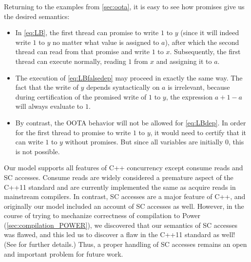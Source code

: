 Returning to the examples from \cref{sec:oota}, it is easy to see how
promises give us the desired semantics:
\begin{itemize}
\item In \ref{eq:LB}, the first thread can promise to write $1$ to $y$ (since
  it will indeed write $1$ to $y$ no matter what value is assigned to
  $a$), after which the second thread can read from that promise and
  write $1$ to $x$.  Subsequently, the first thread can execute
  normally, reading $1$ from $x$ and assigning it to $a$.
\item The execution of \ref{eq:LBfalsedep} may proceed in exactly the same way.  The
  fact that the write of $y$ depends syntactically on $a$ is
  irrelevant, because during certification of the promised write of $1$
  to $y$, the expression $a+1-a$ will always evaluate to $1$.
\item By contrast, the OOTA behavior will not be allowed for \ref{eq:LBdep}.
  In order for the first thread to promise to write $1$ to $y$, it
  would need to certify that it can write $1$ to $y$ 
without promises.  But since all variables are
  initially $0$, this is not possible.
\end{itemize}

Our model supports all features of C++ concurrency except consume
reads and SC accesses.  Consume reads are widely considered a
premature aspect of the C++11 standard and are currently implemented
the same as acquire reads in mainstream compilers.  In contrast, SC
accesses are a major feature of C++, and originally our model included
an account of SC accesses as well.  However, in the course of trying
to mechanize correctness of compilation to Power
(\cref{sec:compilation_POWER}), we discovered that our semantics of SC
accesses was flawed, and this led us to discover a flaw in the C++11
standard as well!  (See \cite{repairing-sc} for further details.)
Thus, a proper handling of SC accesses remains an open and important
problem for future work.




